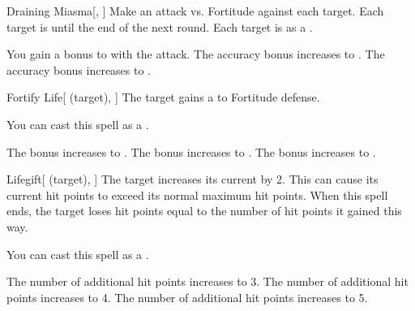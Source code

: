 \lowercase{\hypertarget{spell:Draining Miasma}{}}\label{spell:Draining Miasma}
\begin{freeability}[Rank 1]{\hypertarget{spell:Draining Miasma}{Draining Miasma}}[, ]
Make an attack vs. Fortitude against each target.
\hit Each target is  until the end of the next round.
\crit Each target is  as a .

\rankline
{} You gain a  bonus to  with the attack.
 The accuracy bonus increases to .
 The accuracy bonus increases to .
\end{freeability}
\vspace{0.25em}



\lowercase{\hypertarget{spell:Fortify Life}{}}\label{spell:Fortify Life}
\begin{attuneability}[Rank 1]{\hypertarget{spell:Fortify Life}{Fortify Life}}[ (target), ]
The target gains a   to Fortitude defense.

You can cast this spell as a .

\rankline
{} The bonus increases to .
 The bonus increases to .
 The bonus increases to .
\end{attuneability}
\vspace{0.25em}



\lowercase{\hypertarget{spell:Lifegift}{}}\label{spell:Lifegift}
\begin{attuneability}[Rank 1]{\hypertarget{spell:Lifegift}{Lifegift}}[ (target), ]
The target increases its current  by 2.
This can cause its current hit points to exceed its normal maximum hit points.
When this spell ends, the target loses hit points equal to the number of hit points it gained this way.

You can cast this spell as a .

\rankline
{} The number of additional hit points increases to 3.
 The number of additional hit points increases to 4.
 The number of additional hit points increases to 5.
\end{attuneability}
\vspace{0.25em}



